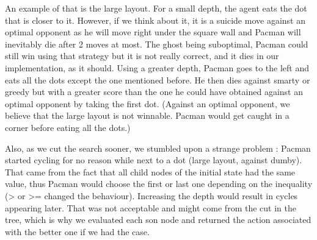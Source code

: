 \documentclass[a4paper, 11pt]{article}
\begin{document}
	An example of that is the large layout. For a small depth, the agent eats the dot that is closer to it. However, if we think about it, it is a suicide move against an optimal opponent as he will move right under the square wall and Pacman will inevitably die after 2 moves at most. The ghost being suboptimal, Pacman could still win using that strategy but it is not really correct, and it dies in our implementation, as it should.\newline
	Using a greater depth, Pacman goes to the left and eats all the dots except the one mentioned before. He then dies against smarty or greedy but with a greater score than the one he could have obtained against an optimal opponent by taking the first dot. (Against an optimal opponent, we believe that the large layout is not winnable. Pacman would get caught in a corner before eating all the dots.)
	
	Also, as we cut the search sooner, we stumbled upon a strange problem : Pacman started cycling for no reason while next to a dot (large layout, against dumby). That came from the fact that all child nodes of the initial state had the same value, thus Pacman would choose the first or last one depending on the inequality (> or >= changed the behaviour). Increasing the depth would result in cycles appearing later. That was not acceptable and might come from the cut in the tree, which is why we evaluated each son node and returned the action associated with the better one if we had the case.
\end{document}
